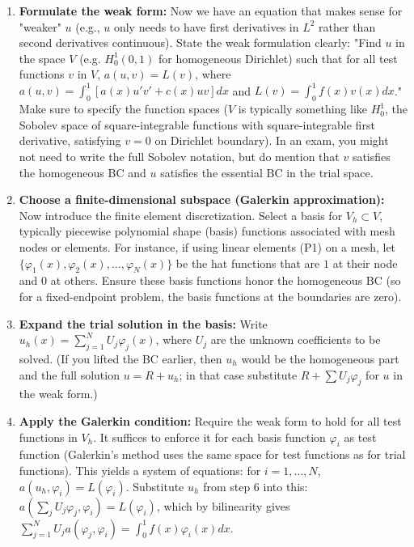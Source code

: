 \documentclass[a4paper,11pt]{report}
\begin{document}
\begin{enumerate}
    \item \textbf{Formulate the weak form:} Now we have an equation that makes sense for "weaker" $u$ (e.g., $u$ only needs to have first derivatives in $L^2$ rather than second derivatives continuous). State the weak formulation clearly: "Find $u$ in the space $V$ (e.g. $H_0^1(0,1)$ for homogeneous Dirichlet) such that for all test functions $v$ in $V$, $a(u,v)=L(v)$, where $a(u,v) = \int_0^1 [a(x) u' v' + c(x) u v]dx$ and $L(v) = \int_0^1 f(x)v(x)dx$." Make sure to specify the function spaces ($V$ is typically something like $H_0^1$, the Sobolev space of square-integrable functions with square-integrable first derivative, satisfying $v=0$ on Dirichlet boundary). In an exam, you might not need to write the full Sobolev notation, but do mention that $v$ satisfies the homogeneous BC and $u$ satisfies the essential BC in the trial space.

    \item \textbf{Choose a finite-dimensional subspace (Galerkin approximation):} Now introduce the finite element discretization. Select a basis for $V_h \subset V$, typically piecewise polynomial shape (basis) functions associated with mesh nodes or elements. For instance, if using linear elements (P1) on a mesh, let $\{\varphi_1(x), \varphi_2(x), \dots, \varphi_N(x)\}$ be the hat functions that are $1$ at their node and $0$ at others. Ensure these basis functions honor the homogeneous BC (so for a fixed-endpoint problem, the basis functions at the boundaries are zero).

    \item \textbf{Expand the trial solution in the basis:} Write $u_h(x) = \sum_{j=1}^N U_j\varphi_j(x)$, where $U_j$ are the unknown coefficients to be solved. (If you lifted the BC earlier, then $u_h$ would be the homogeneous part and the full solution $u = R + u_h$; in that case substitute $R+ \sum U_j \varphi_j$ for $u$ in the weak form.)

    \item \textbf{Apply the Galerkin condition:} Require the weak form to hold for all test functions in $V_h$. It suffices to enforce it for each basis function $\varphi_i$ as test function (Galerkin's method uses the same space for test functions as for trial functions). This yields a system of equations: for $i=1,\dots,N$, $a(u_h,\varphi_i)=L(\varphi_i)$. Substitute $u_h$ from step 6 into this: $a(\sum_j U_j \varphi_j, \varphi_i)=L(\varphi_i)$, which by bilinearity gives $\sum_{j=1}^N U_j a(\varphi_j,\varphi_i) = \int_0^1 f(x) \varphi_i(x) dx$.


\end{enumerate}
\end{document}
